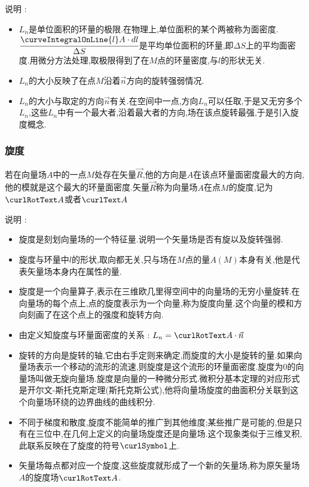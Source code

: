 {{{{      说明 :
      \begin{itemize}
        \item $L_n$是单位面积的环量的极限.在物理上,单位面积的某个两被称为面密度.$\cfrac{\curveIntegralOnLine{l}A \cdot dl}{\Delta S}$是平均单位面积的环量,即$\Delta S$上的平均面密度.用微分方法处理,取极限得到了在$M$点的环量密度,与$l$的形状无关.
        \item $L_n$的大小反映了在点$M$沿着$\vec{n}$方向的旋转强弱情况.
        \item $L_n$的大小与取定的方向$\vec{n}$有关.在空间中一点,方向$L_n$可以任取,于是又无穷多个$L_n$,这些$L_n$中有一个最大者,沿着最大者的方向,场在该点旋转最强,于是引入旋度概念.
      \end{itemize}
    }%

    \subsubsection{旋度}{
      若在向量场$A$中的一点$M$处存在矢量$\vec{R}$,他的方向是$A$在该点环量面密度最大的方向,他的模就是这个最大的环量面密度.矢量$\vec{R}$称为向量场$A$在点$M$的旋度,记为$\curlRotText A$或者$\curlText A$

      说明 :
      \begin{itemize}
        \item 旋度是刻划向量场的一个特征量.说明一个矢量场是否有旋以及旋转强弱.
        \item 旋度与环量中$l$的形状,取向都无关,只与场在$M$点的量$A(M)$本身有关,他是代表矢量场本身内在属性的量.
        \item 旋度是一个向量算子,表示在三维欧几里得空间中的向量场的无穷小量旋转.在向量场的每个点上,点的旋度表示为一个向量,称为旋度向量.这个向量的模和方向刻画了在这个点上的强度和旋转方向.
        \item 由定义知旋度与环量面密度的关系 : $L_n = \curlRotText A \cdot \vec{n}$
        \item 旋转的方向是旋转的轴,它由右手定则来确定,而旋度的大小是旋转的量.如果向量场表示一个移动的流形的流速,则旋度是这个流形的环量面密度.旋度为0的向量场叫做无旋向量场.旋度是向量的一种微分形式.微积分基本定理的对应形式是开尔文-斯托克斯定理(斯托克斯公式),他将向量场旋度的曲面积分关联到这个向量场环绕的边界曲线的曲线积分.
        \item 不同于梯度和散度,旋度不能简单的推广到其他维度;某些推广是可能的,但是只有在三位中,在几何上定义的向量场旋度还是向量场.这个现象类似于三维叉积,此联系反映在了旋度的符号$\curlSymbol$上.
        \item 矢量场每点都对应一个旋度,这些旋度就形成了一个新的矢量场,称为原矢量场$A$的旋度场$\curlRotText A$.
      \end{itemize}
    }%

}}}

